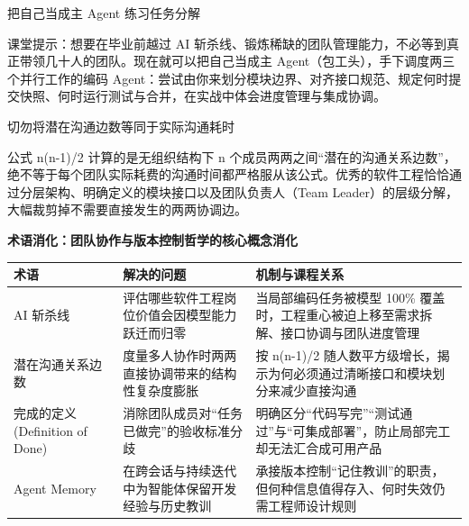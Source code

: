 \documentclass[UTF8,a4paper,11pt,fontset=fandol]{ctexart}
\begin{document}
\begin{knowledgebox}{把自己当成主 Agent 练习任务分解}

课堂提示：想要在毕业前越过 AI 斩杀线、锻炼稀缺的团队管理能力，不必等到真正带领几十人的团队。现在就可以把自己当成主 Agent（包工头），手下调度两三个并行工作的编码 Agent：尝试由你来划分模块边界、对齐接口规范、规定何时提交快照、何时运行测试与合并，在实战中体会进度管理与集成协调。

\end{knowledgebox}

\begin{warningbox}{切勿将潜在沟通边数等同于实际沟通耗时}

公式 n(n-1)/2 计算的是无组织结构下 n 个成员两两之间“潜在的沟通关系边数”，绝不等于每个团队实际耗费的沟通时间都严格服从该公式。优秀的软件工程恰恰通过分层架构、明确定义的模块接口以及团队负责人（Team Leader）的层级分解，大幅裁剪掉不需要直接发生的两两协调边。

\end{warningbox}

\par{}\textbf{术语消化：团队协作与版本控制哲学的核心概念消化}

\begin{center}\small\begin{tabularx}{\linewidth}{YYY}

\toprule

术语 & 解决的问题 & 机制与课程关系\\\midrule

AI 斩杀线 & 评估哪些软件工程岗位价值会因模型能力跃迁而归零 & 当局部编码任务被模型 100\% 覆盖时，工程重心被迫上移至需求拆解、接口协调与团队进度管理\\[3pt]

潜在沟通关系边数 & 度量多人协作时两两直接协调带来的结构性复杂度膨胀 & 按 n(n-1)/2 随人数平方级增长，揭示为何必须通过清晰接口和模块划分来减少直接沟通\\[3pt]

完成的定义 (Definition of Done) & 消除团队成员对“任务已做完”的验收标准分歧 & 明确区分“代码写完”“测试通过”与“可集成部署”，防止局部完工却无法汇合成可用产品\\[3pt]

Agent Memory & 在跨会话与持续迭代中为智能体保留开发经验与历史教训 & 承接版本控制“记住教训”的职责，但何种信息值得存入、何时失效仍需工程师设计规则\\[3pt]

\bottomrule\end{tabularx}\end{center}
\end{document}

